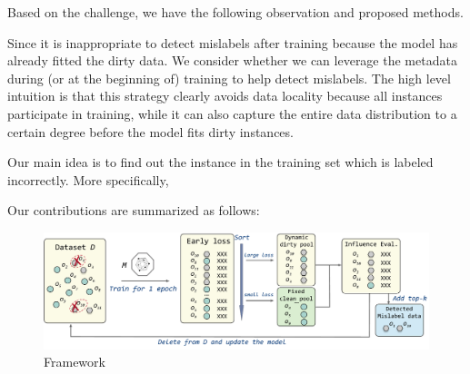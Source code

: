 Based on the challenge, we have the following observation and proposed methods.




 Since it is inappropriate to detect mislabels after training because the model has already fitted the dirty data. We consider whether we can leverage the metadata during (or at the beginning of) training to help detect mislabels. The high level intuition is that this strategy clearly avoids data locality because all instances participate in training, while it can also capture the entire data distribution to a certain degree before the model fits dirty instances. 

Our main idea is to find out the instance in the training set which is labeled incorrectly.
More specifically, 

Our contributions are summarized as follows:


\begin{figure}
	\centering
	\includegraphics[width=\textwidth]{figures/framework}
	\caption{\sys Framework}
	\label{fig:framework}
\end{figure}


\be
	\item 
	\item 
	\item {}
\ee




